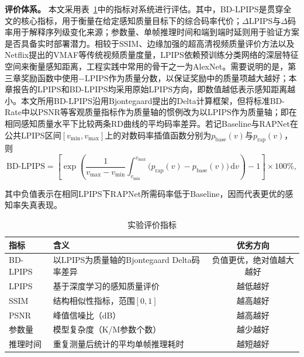 \textbf{评价体系。} 本文采用表~\ref{tab:eval-metrics}中的指标对系统进行评估。其中，BD-LPIPS是贯穿全文的核心指标，用于衡量在给定感知质量目标下的综合码率代价；$\Delta$LPIPS与$\Delta$码率用于解释序列级变化来源；参数量、单帧推理时间和端到端时延则用于验证方案是否具备实时部署潜力。相较于SSIM\cite{ref30-wang2004ssim}、边缘加强的超高清视频质量评价方法\cite{ref68-teng2023uhdvqa}以及Netflix提出的VMAF\cite{ref56-li2019vmaf}等传统视频质量度量，LPIPS\cite{ref31-zhang2018lpips}依赖预训练分类网络的深层特征空间来衡量感知距离，工程实践中常用的骨干之一为AlexNet\cite{Krizhevsky2012ImageNetCW}。需要说明的是，第三章奖励函数中使用$-\mathrm{LPIPS}$作为质量分数，以保证奖励中的质量项越大越好；本章报告的LPIPS和BD-LPIPS均采用原始LPIPS方向，即数值越低表示感知距离越小。本文所用BD-LPIPS沿用Bjontegaard\cite{ref32-bjontegaard2001}提出的Delta计算框架，但将标准BD-Rate中以PSNR等客观质量指标作为质量轴的惯例改为以LPIPS作为质量轴；即在相同感知质量水平下比较两条RD曲线的平均码率差异。若记Baseline与RAPNet在公共LPIPS区间$[v_{\min}, v_{\max}]$上的对数码率插值函数分别为$p_{\text{base}}(v)$与$p_{\text{rap}}(v)$，则
\begin{equation}
  \mathrm{BD\mbox{-}LPIPS} = \left[\exp\left(\frac{1}{v_{\max}-v_{\min}}
  \int_{v_{\min}}^{v_{\max}} \bigl(p_{\text{rap}}(v)-p_{\text{base}}(v)\bigr)\,\mathrm{d}v\right)-1\right]\times 100\%,
  \label{eq:bd-lpips}
\end{equation}

其中负值表示在相同LPIPS下RAPNet所需码率低于Baseline，因而代表更优的感知率失真表现。

\begin{table}[htbp]
  \centering
  \caption{实验评价指标}
  \label{tab:eval-metrics}
  \begin{tabularx}{\textwidth}{lXc}
    \toprule
    \textbf{指标} & \textbf{含义} & \textbf{优劣方向} \\
    \midrule
    BD-LPIPS  & 以LPIPS为质量轴的Bjontegaard Delta码率差异 & 负值更优，绝对值越大越好 \\
    LPIPS     & 基于深度学习的感知质量评价            & 越低越好 \\
    SSIM      & 结构相似性指标，范围$[0, 1]$         & 越高越好 \\
    PSNR      & 峰值信噪比（dB）                     & 越高越好 \\
    参数量     & 模型复杂度（K/M参数个数）            & 越少越好 \\
    推理时间   & 重复测量后统计的平均单帧推理耗时       & 越短越好 \\
    \bottomrule
  \end{tabularx}
\end{table}


